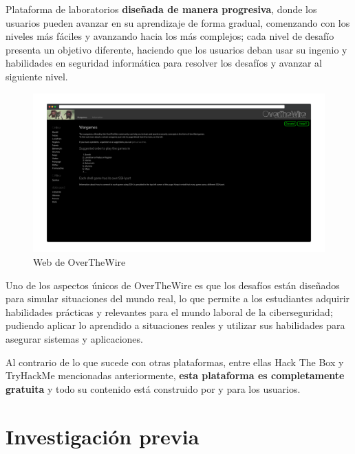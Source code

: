        Plataforma de laboratorios \textbf{diseñada de manera progresiva}, donde los usuarios pueden avanzar en su aprendizaje de forma gradual, comenzando con los niveles más fáciles y avanzando hacia los más complejos; cada nivel de desafío presenta un objetivo diferente, haciendo que los usuarios deban usar su ingenio y habilidades en seguridad informática para resolver los desafíos y avanzar al siguiente nivel.
        
        \begin{figure}[h]
            \centering
            \includegraphics[width=\textwidth]{images/Capturas/Web de OverTheWire.png}
            \caption{Web de OverTheWire}
            \label{fig:OverTheWire-web}
        \end{figure}
        
        Uno de los aspectos únicos de OverTheWire es que los desafíos están diseñados para simular situaciones del mundo real, lo que permite a los estudiantes adquirir habilidades prácticas y relevantes para el mundo laboral de la ciberseguridad; pudiendo aplicar lo aprendido a situaciones reales y utilizar sus habilidades para asegurar sistemas y aplicaciones.
        
        Al contrario de lo que sucede con otras plataformas, entre ellas Hack The Box y TryHackMe mencionadas anteriormente, \textbf{esta plataforma es completamente gratuita} y todo su contenido está construido por y para los usuarios.
        
        \cleardoublepage
    
    

\chapter{Investigación previa}
    \label{cap:investigacion-previa}

